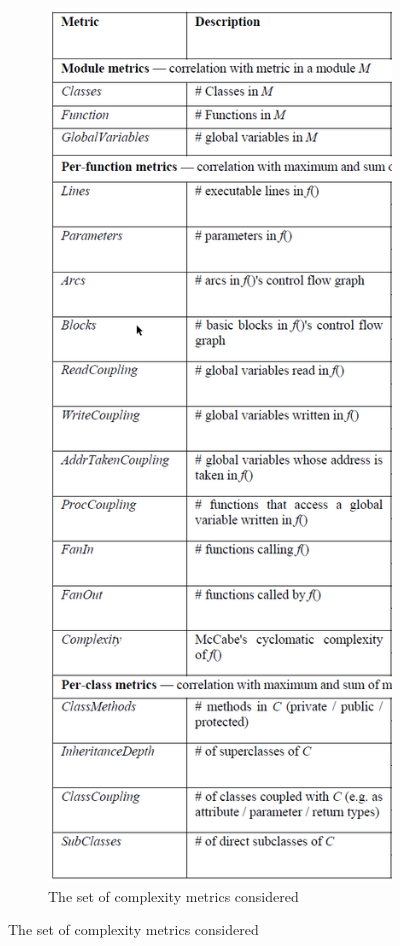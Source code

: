 \documentclass{article}
\begin{document}
\begin{figure}[H]
\begin{subfigure}{.5\textwidth}
         \includegraphics[scale=0.2]{./src/mining_metrics_metrics.png}
         \caption{The set of complexity metrics considered}\label{mining:metrics}
     \end{subfigure}
 \end{figure}
\end{document}
